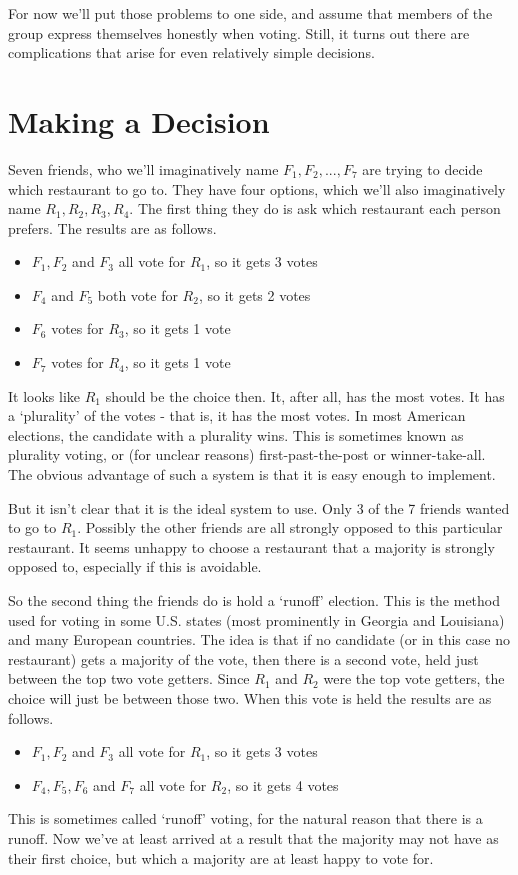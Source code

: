 \documentclass[openany]{book}
\begin{document}
For now we'll put those problems to one side, and assume that members of the group express themselves honestly when voting. Still, it turns out there are complications that arise for even relatively simple decisions.

\section{Making a Decision}
Seven friends, who we'll imaginatively name $F_1, F_2, ..., F_7$ are trying to decide which restaurant to go to. They have four options, which we'll also imaginatively name $R_1, R_2, R_3, R_4$. The first thing they do is ask which restaurant each person prefers. The results are as follows.

\begin{itemize}
\item $F_1, F_2$ and $F_3$ all vote for $R_1$, so it gets 3 votes
\item $F_4$ and $F_5$ both vote for $R_2$, so it gets 2 votes
\item $F_6$ votes for $R_3$, so it gets 1 vote
\item $F_7$ votes for $R_4$, so it gets 1 vote
\end{itemize}
It looks like $R_1$ should be the choice then. It, after all, has the most votes. It has a `plurality' of the votes - that is, it has the most votes. In most American elections, the candidate with a plurality wins. This is sometimes known as plurality voting, or (for unclear reasons) first-past-the-post or winner-take-all. The obvious advantage of such a system is that it is easy enough to implement.

But it isn't clear that it is the ideal system to use. Only 3 of the 7 friends wanted to go to $R_1$. Possibly the other friends are all strongly opposed to this particular restaurant. It seems unhappy to choose a restaurant that a majority is strongly opposed to, especially if this is avoidable.

So the second thing the friends do is hold a `runoff' election. This is the method used for voting in some U.S. states (most prominently in Georgia and Louisiana) and many European countries. The idea is that if no candidate (or in this case no restaurant) gets a majority of the vote, then there is a second vote, held just between the top two vote getters. Since $R_1$ and $R_2$ were the top vote getters, the choice will just be between those two. When this vote is held the results are as follows.

\begin{itemize}
\item $F_1, F_2$ and $F_3$ all vote for $R_1$, so it gets 3 votes
\item $F_4, F_5, F_6$ and $F_7$ all vote for $R_2$, so it gets 4 votes
\end{itemize}
This is sometimes called `runoff' voting, for the natural reason that there is a runoff. Now we've at least arrived at a result that the majority may not have as their first choice, but which a majority are at least happy to vote for.
\end{document}
